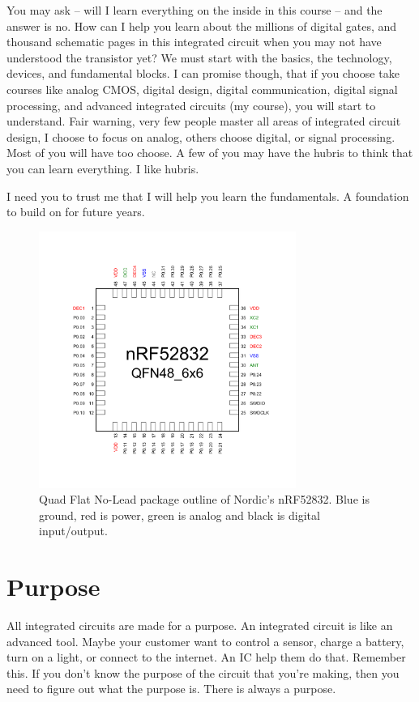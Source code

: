 \documentclass[technote,10pt,a4paper]{IEEEtran}
\begin{document}
You may ask -- will I learn everything on the inside in this course -- and the
answer is no. How can I help you learn about the millions of digital
gates, and thousand schematic pages in this integrated circuit when you may not
have understood the transistor yet? We must start with the basics, the
technology, devices, and fundamental blocks.  I can promise though, that if you choose take courses like
analog CMOS, digital design, digital communication, digital signal processing,
and advanced integrated circuits (my course), you will start to understand. Fair
warning, very few people master all areas of integrated circuit design, I choose to
focus on analog, others choose digital, or signal processing. Most of you will have too choose. A few of you may have the hubris
to think that you can learn everything. I like hubris.

I need you to trust me that I will help you learn the fundamentals. A
foundation to build on for future years.


\begin{figure}[tb]
  \centerline{\includegraphics[width=3.3in]{qfn48}}
  \caption{Quad Flat No-Lead package outline of Nordic's nRF52832. Blue is
    ground, red is power, green is analog and black is digital input/output.}
\label{fig_qfn}
\end{figure}


\section{Purpose}
All integrated circuits are made for a purpose. An integrated circuit is like an advanced tool.
Maybe your customer want to control a sensor, charge a battery, turn on a light, or connect to the internet. An
IC help them do that. Remember this. If you don't know the purpose of the circuit that you're making,
then you need to figure out what the purpose is. There is always a purpose.
\end{document}
